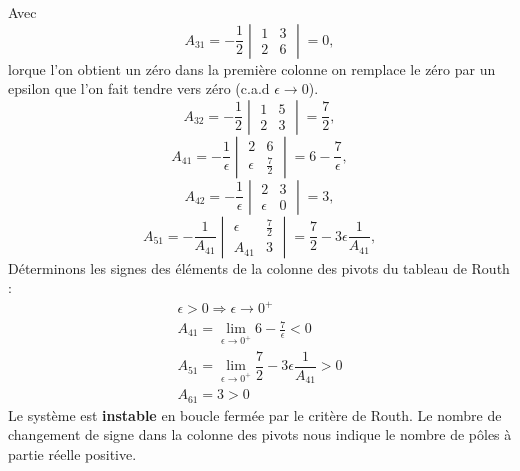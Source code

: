 Avec
\[
A_{31}=-\dfrac{1}{2}\begin{vmatrix}1 & 3 \\2&6\end{vmatrix}=0,
\]
lorque l'on obtient un zéro dans la première colonne on remplace le zéro 
par un epsilon que l'on fait tendre vers zéro (c.a.d $\epsilon\rightarrow0$).
\[
A_{32}=-\dfrac{1}{2}\begin{vmatrix}1 & 5 \\2&3\end{vmatrix}=\dfrac{7}{2},
\]
\[
A_{41}=-\dfrac{1}{\epsilon}
       \begin{vmatrix}
           2 & 6 \\
           \epsilon&\frac{7}{2}
       \end{vmatrix}
      =6-\frac{7}{\epsilon},
\]
\[
A_{42}=-\dfrac{1}{\epsilon}\begin{vmatrix}2 & 3 \\\epsilon&0\end{vmatrix}=3,
\]
\[
A_{51}=-\dfrac{1}{A_{41}}
       \begin{vmatrix}
       \epsilon & \frac{7}{2} \\
        A_{41}&3
       \end{vmatrix}
      =\dfrac{7}{2}-3\epsilon\dfrac{1}{A_{41}},
\]
Déterminons les signes des éléments de la colonne des pivots
du tableau de Routh :
\begin{align*}
\epsilon >0 \Rightarrow \epsilon\rightarrow0^+ \\
    A_{41}=\lim\limits_{\epsilon\rightarrow 0^+}6-\frac{7}{\epsilon} <0  \\
    A_{51}=\lim\limits_{\epsilon\rightarrow 0^+}
    \dfrac{7}{2}-3\epsilon\dfrac{1}{A_{41}} >0 \\
    A_{61}=3 > 0
\end{align*}
Le système est \textbf{instable} en boucle fermée par le critère de Routh.
Le nombre de changement de signe dans la colonne des pivots nous indique le 
nombre de pôles à partie réelle positive.
